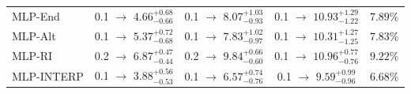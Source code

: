 \begin{tabular}{lcccc}
MLP-End & 0.1 $\rightarrow$ $4.66^{+0.68}_{-0.66}$ & 0.1 $\rightarrow$ $8.07^{+1.03}_{-0.93}$ & 0.1 $\rightarrow$ $10.93^{+1.29}_{-1.22}$ & $7.89\%$ \\
MLP-Alt & 0.1 $\rightarrow$ $5.37^{+0.72}_{-0.68}$ & 0.1 $\rightarrow$ $7.83^{+1.02}_{-0.97}$ & 0.1 $\rightarrow$ $10.31^{+1.27}_{-1.25}$ & $7.83\%$ \\
MLP-RI & 0.2 $\rightarrow$ $6.87^{+0.47}_{-0.44}$ & 0.2 $\rightarrow$ $9.84^{+0.66}_{-0.60}$ & 0.1 $\rightarrow$ $10.96^{+0.77}_{-0.76}$ & $9.22\%$ \\
MLP-INTERP & 0.1 $\rightarrow$ $3.88^{+0.56}_{-0.53}$ & 0.1 $\rightarrow$ $6.57^{+0.74}_{-0.76}$ & 0.1 $\rightarrow$ $9.59^{+0.99}_{-0.96}$ & $6.68\%$ \\
\bottomrule
\end{tabular}
